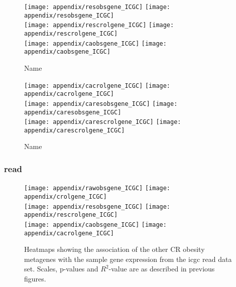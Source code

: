 \begin{appendices}
	\begin{figure}[htpb]
		\ContinuedFloat
		\captionsetup{list=off,format=cont}
		\centering
		\texttt{[image: appendix/resobsgene\_ICGC]}
		\hfill
		\texttt{[image: appendix/resobsgene\_ICGC]}\\
		\texttt{[image: appendix/rescrolgene\_ICGC]}
		\hfill
		\texttt{[image: appendix/rescrolgene\_ICGC]}\\
		\texttt{[image: appendix/caobsgene\_ICGC]}
		\hfill
		\texttt{[image: appendix/caobsgene\_ICGC]}\\
		\caption{Name}
	\end{figure}

	\begin{figure}[htpb]
		\ContinuedFloat
		\captionsetup{list=off,format=cont}
		\centering
		\texttt{[image: appendix/cacrolgene\_ICGC]}
		\hfill
		\texttt{[image: appendix/cacrolgene\_ICGC]}\\
		\texttt{[image: appendix/caresobsgene\_ICGC]}
		\hfill
		\texttt{[image: appendix/caresobsgene\_ICGC]}\\
		\texttt{[image: appendix/carescrolgene\_ICGC]}
		\hfill
		\texttt{[image: appendix/carescrolgene\_ICGC]}\\
		\caption{Name}
	\end{figure}

	\newpage

	\subsubsection{\gls{read}}
	\label{ssub:read}
	
	\begin{figure}[htp!]
		\centering
		\texttt{[image: appendix/rawobsgene\_ICGC]}
		\hfill
		\texttt{[image: appendix/crolgene\_ICGC]}\\
		\texttt{[image: appendix/resobsgene\_ICGC]}
		\hfill
		\texttt{[image: appendix/rescrolgene\_ICGC]}\\
		\texttt{[image: appendix/caobsgene\_ICGC]}
		\hfill
		\texttt{[image: appendix/cacrolgene\_ICGC]}\\
		\caption{Heatmaps showing the association of the other CR obesity metagenes with the sample gene expression from the \gls{icgc} \gls{read} data set.
		Scales, p-values and $R^2$-value are as described in previous figures.}
		\label{fig:degmetaicgc_read}
	\end{figure}


\end{appendices}
